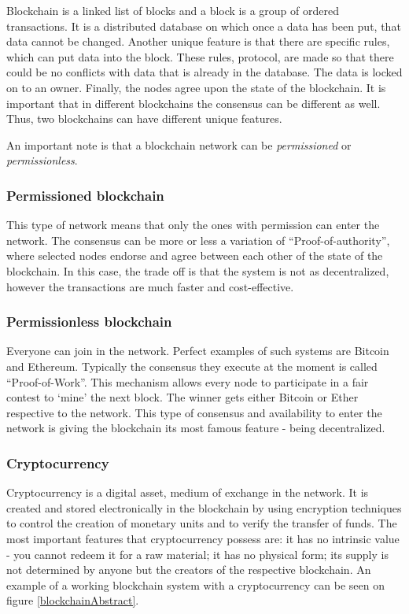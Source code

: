 \documentclass[a4paper,11pt]{report}
\begin{document}
	Blockchain is a linked list of blocks and a block is a group of ordered transactions. It is a distributed database on which once a data has been put, that data cannot be changed. Another unique feature is that there are specific rules, which can put data into the block. These rules, protocol, are made so that there could be no conflicts with data that is already in the database. The data is locked on to an owner. Finally, the nodes agree upon the state of the blockchain.\cite{whatIsBlockchain} It is important that in different blockchains the consensus can be different as well. Thus, two blockchains can have different unique features.
	
	An important note is that a blockchain network can be \textit{permissioned} or \textit{permissionless}.

\subsubsection{Permissioned blockchain}
This type of network means that only the ones with permission can enter the network. The consensus can be more or less a variation of “Proof-of-authority”, where selected nodes endorse and agree between each other of the state of the blockchain. In this case, the trade off is that the system is not as decentralized, however the transactions are much faster and cost-effective.

\subsubsection{Permissionless blockchain}
Everyone can join in the network. Perfect examples of such systems are Bitcoin and Ethereum. Typically the consensus they execute at the moment is called “Proof-of-Work”. This mechanism allows every node to participate in a fair contest to ‘mine’ the next block. The winner gets either Bitcoin or Ether respective to the network. This type of consensus and availability to enter the network is giving the blockchain its most famous feature - being decentralized.

\subsubsection{Cryptocurrency}
Cryptocurrency is a digital asset, medium of exchange in the network. It is created and stored electronically in the blockchain by using encryption techniques to control the creation of monetary units and to verify the transfer of funds. The most important features that cryptocurrency possess are: it has no intrinsic value - you cannot redeem it for a raw material; it has no physical form; its supply is not determined by anyone but the creators of the respective blockchain. \cite{whatIsCryptocurrency}
An example of a working blockchain system with a cryptocurrency can be seen on figure \ref{blockchainAbstract}. 
\end{document}
